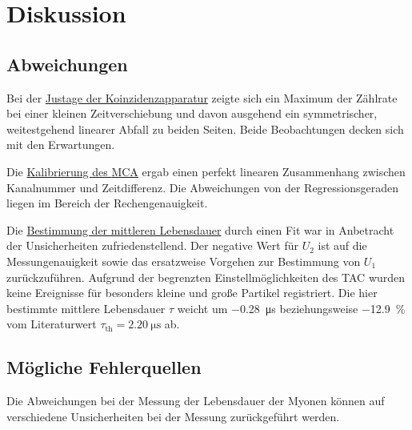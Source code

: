 \section{Diskussion}
\label{sec:diskussion}

\subsection{Abweichungen}
Bei der \hyperref[sec:auswertung:koinzidenz]{Justage der Koinzidenzapparatur} zeigte sich
ein Maximum der Zählrate bei einer kleinen Zeitverschiebung
und davon ausgehend ein symmetrischer, weitestgehend linearer Abfall zu beiden Seiten.
Beide Beobachtungen decken sich mit den Erwartungen. %

Die \hyperref[sec:auswertung:mca]{Kalibrierung des \acs{MCA}} ergab einen perfekt linearen Zusammenhang zwischen Kanalnummer und Zeitdifferenz.
Die Abweichungen von der Regressionsgeraden liegen im Bereich der Rechengenauigkeit.

Die \hyperref[sec:auswertung:lebensdauer]{Bestimmung der mittleren Lebensdauer} durch einen Fit war in Anbetracht der Unsicherheiten zufriedenstellend.
Der negative Wert für $U_2$ ist auf die Messungenauigkeit sowie das ersatzweise Vorgehen zur Bestimmung von $U_1$ zurückzuführen.
Aufgrund der begrenzten Einstellmöglichkeiten des \ac{TAC} wurden keine Ereignisse für besonders kleine und große Partikel registriert.
Die hier bestimmte mittlere Lebensdauer $\tau$
weicht um \SI{-0.28}{\micro\second} beziehungsweise \SI{-12.9}{\percent} vom Literaturwert $\tau_\text{th} = \SI{2.20}{\micro\second}$ \cite{pdg} ab.


\subsection{Mögliche Fehlerquellen}

Die Abweichungen bei der Messung der Lebensdauer der Myonen können auf verschiedene Unsicherheiten bei der Messung zurückgeführt werden.


